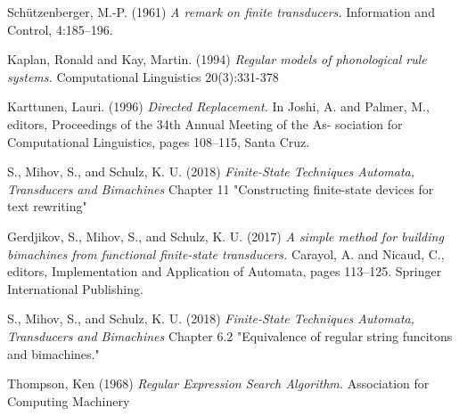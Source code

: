 \documentclass[12pt, oneside]{article}
\theoremstyle{definition}
\begin{document}
\pagebreak
\begin{thebibliography}{9}
	
	Schützenberger, M.-P. (1961)
	\textit{A remark on finite transducers.} 
	Information and Control, 4:185–196.

	Kaplan, Ronald and Kay, Martin. (1994)
	\textit{Regular models of phonological rule systems.}
	Computational Linguistics 20(3):331-378

	Karttunen, Lauri. (1996)
	\textit{Directed Replacement.}
	In Joshi, A. and Palmer, M., editors, Proceedings of the 34th Annual Meeting of the As- sociation for Computational Linguistics, pages 108–115, Santa Cruz.

	S., Mihov, S., and Schulz, K. U. (2018)
	\textit{Finite-State Techniques Automata, Transducers and Bimachines}
	Chapter 11 "Constructing finite-state devices for text rewriting"

	Gerdjikov, S., Mihov, S., and Schulz, K. U. (2017)
	\textit{A simple method for building bimachines from functional finite-state transducers.} 
	Carayol, A. and Nicaud, C., editors, Implementation and Application of Automata, pages 113–125. Springer International Publishing.

	S., Mihov, S., and Schulz, K. U. (2018)
	\textit{Finite-State Techniques Automata, Transducers and Bimachines}
	Chapter 6.2 "Equivalence of regular string funcitons and bimachines."

	Thompson, Ken (1968) 
	\textit{Regular Expression Search Algorithm.} 
	Association for Computing Machinery

\end{thebibliography}	
\end{document}
